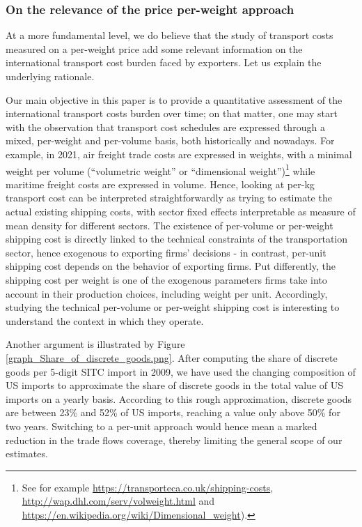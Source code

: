 \documentclass[a4paper,11pt]{article}
\begin{document}
\subsubsection{On the relevance of the price per-weight approach}
At a more fundamental level, we do believe that the study of transport costs measured on a per-weight price add some relevant information on the international transport cost burden faced by exporters. Let us explain the underlying rationale.

Our main objective in this paper is to provide a quantitative assessment of the international transport costs burden over time; on that matter, one may start with the observation that transport cost schedules are expressed through a mixed, per-weight and per-volume basis, both historically and nowadays. For example, in 2021, air freight trade costs are expressed in weights, with a minimal weight per volume (``volumetric weight'' or ``dimensional weight'')\footnote{See for example \href{https://transporteca.co.uk/shipping-costs}{https://transporteca.co.uk/shipping-costs}, \href{http://wap.dhl.com/serv/volweight.html}{http://wap.dhl.com/serv/volweight.html} and \href{https://en.wikipedia.org/wiki/Dimensional_weight}{ https://en.wikipedia.org/wiki/Dimensional\_weight}).} while maritime freight costs are expressed in volume.
Hence, looking at per-kg transport cost can be interpreted straightforwardly as trying to estimate the actual existing shipping costs, with sector fixed effects interpretable as measure of mean density for different sectors. The existence of per-volume or per-weight shipping cost is directly linked to the technical constraints of the transportation sector, hence exogenous to exporting firms' decisions - in contrast, per-unit shipping cost depends on the behavior of exporting firms. Put differently, the shipping cost per weight is one of the exogenous parameters firms take into account in their production choices, including weight per unit. Accordingly, studying the technical per-volume or per-weight shipping cost is interesting to understand the context in which they operate.

Another argument is illustrated by Figure \ref{graph_Share_of_discrete_goods.png}. After computing the share of discrete goods per 5-digit SITC import in 2009, we have used the changing composition of US imports to approximate the share of discrete goods in the total value of US imports on a yearly basis. According to this rough approximation, discrete goods are between 23\% and 52\% of US imports, reaching a value only above 50\% for two years. Switching to a per-unit approach would hence mean a marked reduction in the trade flows coverage, thereby limiting the general scope of our estimates.
\end{document}
